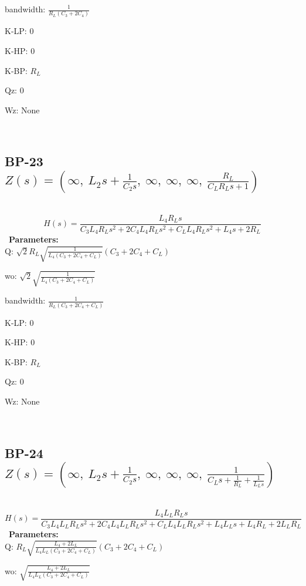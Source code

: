 \documentclass{article}
\begin{document}
bandwidth: $\frac{1}{R_{L} \left(C_{3} + 2 C_{4}\right)}$\ 

K-LP: $0$\ 

K-HP: $0$\ 

K-BP: $R_{L}$\ 

Qz: $0$\ 

Wz: $\text{None}$\ 

\ 

\subsection{BP-23 $Z(s) = \left( \infty, \  L_{2} s + \frac{1}{C_{2} s}, \  \infty, \  \infty, \  \infty, \  \frac{R_{L}}{C_{L} R_{L} s + 1}\right)$ } \ 
\textbf{\[H(s) = \frac{L_{4} R_{L} s}{C_{3} L_{4} R_{L} s^{2} + 2 C_{4} L_{4} R_{L} s^{2} + C_{L} L_{4} R_{L} s^{2} + L_{4} s + 2 R_{L}}\] } \ 
\textbf{Parameters:}\\ 

Q: $\sqrt{2} R_{L} \sqrt{\frac{1}{L_{4} \left(C_{3} + 2 C_{4} + C_{L}\right)}} \left(C_{3} + 2 C_{4} + C_{L}\right)$\ 

wo: $\sqrt{2} \sqrt{\frac{1}{L_{4} \left(C_{3} + 2 C_{4} + C_{L}\right)}}$\ 

bandwidth: $\frac{1}{R_{L} \left(C_{3} + 2 C_{4} + C_{L}\right)}$\ 

K-LP: $0$\ 

K-HP: $0$\ 

K-BP: $R_{L}$\ 

Qz: $0$\ 

Wz: $\text{None}$\ 

\ 

\subsection{BP-24 $Z(s) = \left( \infty, \  L_{2} s + \frac{1}{C_{2} s}, \  \infty, \  \infty, \  \infty, \  \frac{1}{C_{L} s + \frac{1}{R_{L}} + \frac{1}{L_{L} s}}\right)$ } \ 
\textbf{\[H(s) = \frac{L_{4} L_{L} R_{L} s}{C_{3} L_{4} L_{L} R_{L} s^{2} + 2 C_{4} L_{4} L_{L} R_{L} s^{2} + C_{L} L_{4} L_{L} R_{L} s^{2} + L_{4} L_{L} s + L_{4} R_{L} + 2 L_{L} R_{L}}\] } \ 
\textbf{Parameters:}\\ 

Q: $R_{L} \sqrt{\frac{L_{4} + 2 L_{L}}{L_{4} L_{L} \left(C_{3} + 2 C_{4} + C_{L}\right)}} \left(C_{3} + 2 C_{4} + C_{L}\right)$\ 

wo: $\sqrt{\frac{L_{4} + 2 L_{L}}{L_{4} L_{L} \left(C_{3} + 2 C_{4} + C_{L}\right)}}$\ 
\end{document}

